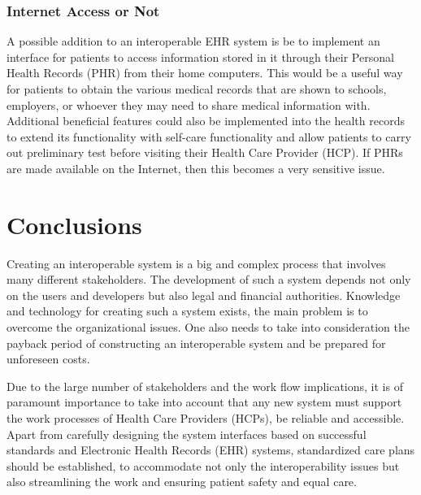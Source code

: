 \documentclass[14pt]{article}
\begin{document}
\subsubsection{Internet Access or Not}%
\label{sec:resultsPHR}
A possible addition to an interoperable EHR system is be to implement an interface for patients to access information stored in it through their Personal Health Records (PHR) from their home computers. This would be a useful way for patients to obtain the various medical records that are shown to schools, employers, or whoever they may need to share medical information with. Additional beneficial features could also be implemented into the health records to extend its functionality with self-care functionality and allow patients to carry out preliminary test before visiting their Health Care Provider (HCP). If PHRs are made available on the Internet, then this becomes a very sensitive issue.

\newpage

\section{Conclusions}
\label{sec:Conclusions}

Creating an interoperable system is a big and complex process that involves many different stakeholders. The development of such a system depends not only on the users and developers but also legal and financial authorities. Knowledge and technology for creating such a system exists, the main problem is to overcome the organizational issues. One also needs to take into consideration the payback period of constructing an interoperable system and be prepared for unforeseen costs.

Due to the large number of stakeholders and the work flow implications, it is of paramount importance to take into account that any new system must support the work processes of Health Care Providers (HCPs), be reliable and accessible. Apart from carefully designing the system interfaces based on successful standards and Electronic Health Records (EHR) systems, standardized care plans should be established, to accommodate not only the interoperability issues but also streamlining the work and ensuring patient safety and equal care.
\end{document}
